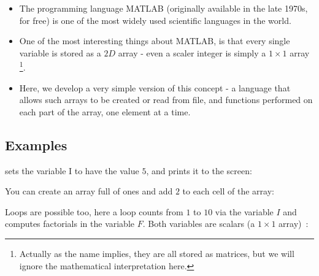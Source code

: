 
\begin{itemize}
\item The programming language MATLAB (originally available in the late
1970s, for free) is one of the most widely used scientific languages in
the world.
\item One of the most interesting things about MATLAB, is that every
single variable is stored as a $2D$ array - even a scaler integer
is simply a $1\times1$ array \footnote{Actually as the name implies,
they are all stored as matrices, but we will ignore the mathematical
interpretation here.}.
\item Here, we develop a very simple version of this concept - a language
that allows such arrays to be created or read from file, and functions performed
on each part of the array, one element at a time.
\end{itemize}

\subsection*{Examples}




sets the variable I to have the value $5$, and prints it to the screen:





You can create an array full of ones and add $2$ to each cell of the array:





Loops are possible too, here a loop counts from $1$ to $10$ via the variable $I$ and computes factorials in the variable $F$. Both variables are scalars (a $1\times1$ array)~:


